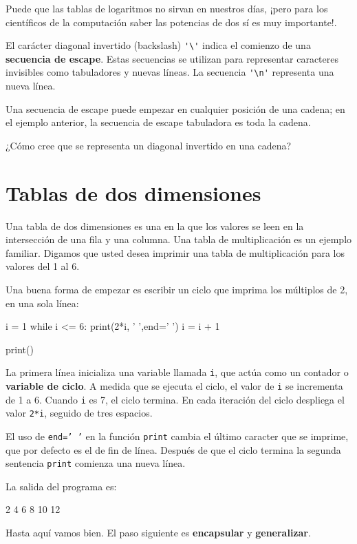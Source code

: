 Puede que las tablas de logaritmos no sirvan en nuestros días, ¡pero
para los científicos de la computación saber las potencias de dos
sí es muy importante!.


El carácter diagonal invertido (backslash) \verb+'\'+ indica el comienzo
de una \textbf{secuencia de escape}. Estas secuencias se utilizan
para representar caracteres invisibles como tabuladores y nuevas líneas.
La secuencia \verb+'\n'+ representa una nueva línea.

Una secuencia de escape puede empezar en cualquier posición de una
cadena; en el ejemplo anterior, la secuencia de escape tabuladora
es toda la cadena.

¿Cómo cree que se representa un diagonal invertido en una cadena?

\section{Tablas de dos dimensiones}


Una tabla de dos dimensiones es una en la que los valores se leen
en la intersección de una fila y una columna. Una tabla de multiplicación
es un ejemplo familiar. Digamos que usted desea imprimir una tabla
de multiplicación para los valores del 1 al 6.

Una buena forma de empezar es escribir un ciclo que imprima los múltiplos
de 2, en una sola línea:
\begin{pythoncode}
i = 1
while i <= 6:
  print(2*i, '   ',end=' ')
  i = i + 1

print()
\end{pythoncode}

La primera línea inicializa una variable llamada \texttt{i}, que actúa
como un contador o \textbf{variable de ciclo}. A medida que se ejecuta
el ciclo, el valor de \texttt{i} se incrementa de 1 a 6. Cuando \texttt{i}
es 7, el ciclo termina. En cada iteración del ciclo despliega el valor
\texttt{2{*}i}, seguido de tres espacios.

El uso de \texttt{end=' '} en la función \texttt{print} cambia el
último caracter que se imprime, que por defecto es el de fin de línea.
Después de que el ciclo termina la segunda sentencia \texttt{print}
comienza una nueva línea.

La salida del programa es:
\begin{pythoncode}
2      4      6      8      10     12
\end{pythoncode}
Hasta aquí vamos bien. El paso siguiente es \textbf{encapsular} y
\textbf{generalizar}.

